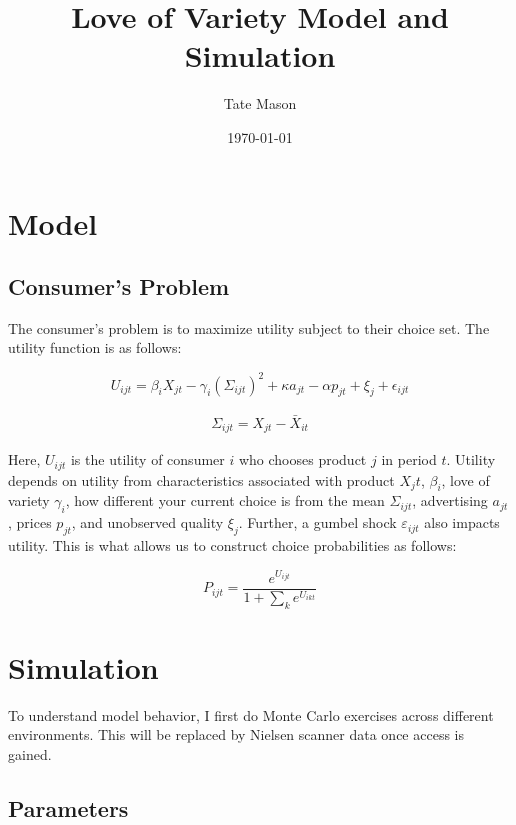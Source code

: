 \documentclass[11pt]{article}
\title{Love of Variety Model and Simulation}
\author{Tate Mason}
\date{\today}
\theoremstyle{definition}
\theoremstyle{remark}
\begin{document}
\maketitle
\thispagestyle{empty}


\newpage
\setcounter{page}{1}

\section{Model}

\subsection{Consumer's Problem}
The consumer's problem is to maximize utility subject to their choice set. The utility function is as follows:

\begin{equation}
  U_{ijt} = \beta_i X_{jt} - \gamma_{i}(\Sigma_{ijt})^2 + \kappa a_{jt} - \alpha p_{jt} + \xi_j + \epsilon_{ijt}
\end{equation}

\begin{gather*}
  \Sigma_{ijt} = X_{jt}-\bar{X}_{it}
\end{gather*}

Here, $U_{ijt}$ is the utility of consumer $i$ who chooses product $j$ in period $t$. Utility depends on utility from characteristics associated with product $X_jt$, $\beta_i$,
love of variety $\gamma_i$, how different your current choice is from the mean $\Sigma_{ijt}$, advertising $a_{jt}$, prices $p_{jt}$, and unobserved quality $\xi_j$.
Further, a gumbel shock $\varepsilon_{ijt}$ also impacts utility. This is what allows us to construct choice probabilities as follows:

\begin{equation}
  P_{ijt} = \frac{e^{U_{ijt}}}{1 + \sum_{k} e^{U_{ikt}}}
\end{equation}

\section{Simulation}

To understand model behavior, I first do Monte Carlo exercises across different environments. This will be replaced by Nielsen scanner data once access is gained.

\subsection{Parameters}
\end{document}
